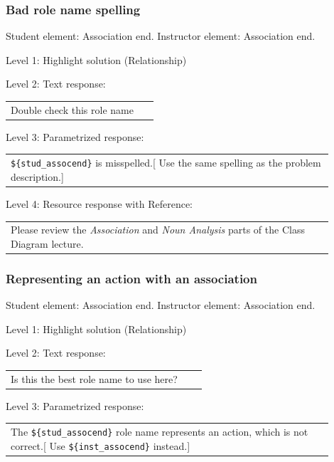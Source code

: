 \subsubsection{Bad role name spelling}

Student element: Association end. Instructor element: Association end. \medskip

\noindent Level 1: Highlight solution (Relationship) \medskip

\noindent Level 2: Text response: \medskip

\begin{tabular}{|p{0.9\linewidth}}
Double check this role name
\end{tabular} \medskip

\noindent Level 3: Parametrized response: \medskip

\begin{tabular}{|p{0.9\linewidth}}
\verb|${stud_assocend}| is misspelled.[ Use the same spelling as the problem description.]
\end{tabular} \medskip

\noindent Level 4: Resource response with Reference: \medskip

\begin{tabular}{|p{0.9\linewidth}}
Please review the \textit{Association} and \textit{Noun Analysis} parts of the Class Diagram lecture.
\end{tabular} \medskip


\subsubsection{Representing an action with an association}

Student element: Association end. Instructor element: Association end. \medskip

\noindent Level 1: Highlight solution (Relationship) \medskip

\noindent Level 2: Text response: \medskip

\begin{tabular}{|p{0.9\linewidth}}
Is this the best role name to use here?
\end{tabular} \medskip

\noindent Level 3: Parametrized response: \medskip

\begin{tabular}{|p{0.9\linewidth}}
The \verb|${stud_assocend}| role name represents an action, which is not correct.[ Use \verb|${inst_assocend}| instead.]
\end{tabular} \medskip

